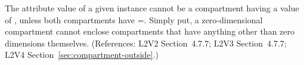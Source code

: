 The  attribute value of a given \Compartment
instance cannot be a compartment having a  value of
, unless both compartments have =.
Simply put, a zero-dimensional compartment cannot enclose compartments that
have anything other than zero dimensions themselves.  (References: L2V2
Section~4.7.7; L2V3 Section~4.7.7; L2V4 Section~\ref{sec:compartment-outside}.)
